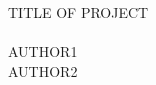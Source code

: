 \documentclass[a4paper,11pt]{article}
\begin{document}
\begin{titlepage}
	\begin{center}
		\vspace{2cm}
		\textsc{TITLE OF PROJECT\\}
		\\[10cm]
		\textsc{AUTHOR1\\}
		\textsc{AUTHOR2\\}
		\vspace{2cm}
		\vfill
	\end{center}
\end{titlepage}

\section{}
\end{document}
